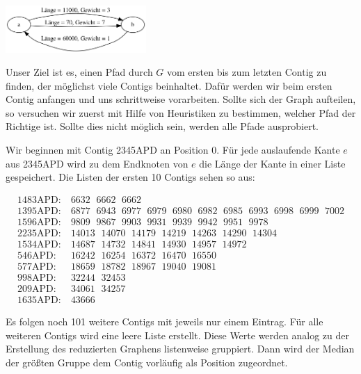 \begin{center}
\includegraphics[width=0.4\textwidth]{bilder/dreikannten}
\end{center}


Unser Ziel ist es, 
einen Pfad durch $G$ 
vom ersten bis zum letzten Contig zu finden, der möglichst viele Contigs beinhaltet.
Dafür werden wir beim ersten Contig anfangen und uns schrittweise vorarbeiten. Sollte sich der Graph aufteilen, so versuchen wir zuerst mit Hilfe von Heuristiken zu bestimmen, welcher Pfad der Richtige ist. Sollte dies nicht möglich sein, werden alle Pfade ausprobiert.

Wir beginnen mit Contig 2345APD an Position 0. Für jede auslaufende Kante $e$ aus 2345APD wird zu dem Endknoten von $e$ die Länge der Kante in einer Liste gespeichert. Die Listen der ersten 10 Contigs sehen so aus:

\begin{footnotesize}
\begin{align*}
\text{1483APD:}&\ 6632\ \ \,6662\ \ \,6662\\
\text{1395APD:}&\ 6877\ \ \,6943\ \ \,6977\ \ \,6979\ \ \,6980\ \ \,6982\ \ \,6985\ \ \,6993\ \ \,6998\ \ \,6999\ \ \,7002\\
\text{1596APD:}&\ 9809\ \ \,9867\ \ \,9903\ \ \,9931\ \ \,9939\ \ \,9942\ \ \,9951\ \ \,9978\\
\text{2235APD:}&\ 14013\ \ \,14070\ \ \,14179\ \ \,14219\ \ \,14263\ \ \,14290\ \ \,14304\\
\text{1534APD:}&\ 14687\ \ \,14732\ \ \,14841\ \ \,14930\ \ \,14957\ \ \,14972\\
\text{546APD:}&\ 16242\ \ \,16254\ \ \,16372\ \ \,16470\ \ \,16550\\
\text{577APD:}&\ 18659\ \ \,18782\ \ \,18967\ \ \,19040\ \ \,19081\\
\text{998APD:}&\ 32244\ \ \,32453\\
\text{209APD:}&\ 34061\ \ \,34257\\
\text{1635APD:}&\ 43666
\end{align*}
\end{footnotesize}

Es folgen noch 101 weitere Contigs mit jeweils nur einem Eintrag. 
Für alle weiteren Contigs wird eine leere Liste erstellt.
Diese Werte werden analog zu der Erstellung des reduzierten Graphens listenweise gruppiert. Dann wird der Median der größten Gruppe dem Contig vorläufig als Position zugeordnet.

